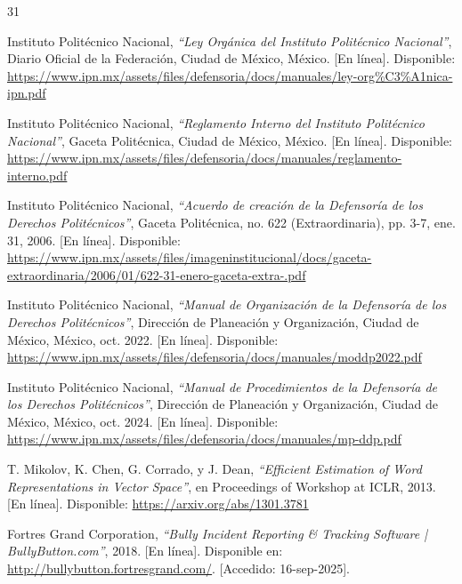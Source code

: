 
\begin{thebibliography}{31}
\sloppy

Instituto Politécnico Nacional, \textit{``Ley Orgánica del Instituto Politécnico Nacional''}, Diario Oficial de la Federación, Ciudad de México, México. [En línea]. Disponible: \url{https://www.ipn.mx/assets/files/defensoria/docs/manuales/ley-org%C3%A1nica-ipn.pdf}

Instituto Politécnico Nacional, \textit{``Reglamento Interno del Instituto Politécnico Nacional''}, Gaceta Politécnica, Ciudad de México, México. [En línea]. Disponible: \url{https://www.ipn.mx/assets/files/defensoria/docs/manuales/reglamento-interno.pdf}

Instituto Politécnico Nacional, \textit{``Acuerdo de creación de la Defensoría de los Derechos Politécnicos''}, Gaceta Politécnica, no. 622 (Extraordinaria), pp. 3-7, ene. 31, 2006. [En línea]. Disponible: \url{https://www.ipn.mx/assets/files/imageninstitucional/docs/gaceta-extraordinaria/2006/01/622-31-enero-gaceta-extra-.pdf}

Instituto Politécnico Nacional, \textit{``Manual de Organización de la Defensoría de los Derechos Politécnicos''}, Dirección de Planeación y Organización, Ciudad de México, México, oct. 2022. [En línea]. Disponible: \url{https://www.ipn.mx/assets/files/defensoria/docs/manuales/moddp2022.pdf}

Instituto Politécnico Nacional, \textit{``Manual de Procedimientos de la Defensoría de los Derechos Politécnicos''}, Dirección de Planeación y Organización, Ciudad de México, México, oct. 2024. [En línea]. Disponible: \url{https://www.ipn.mx/assets/files/defensoria/docs/manuales/mp-ddp.pdf}

T. Mikolov, K. Chen, G. Corrado, y J. Dean, \textit{``Efficient Estimation of Word Representations in Vector Space''}, en Proceedings of Workshop at ICLR, 2013. [En línea]. Disponible: \url{https://arxiv.org/abs/1301.3781}

Fortres Grand Corporation, \textit{``Bully Incident Reporting \& Tracking Software | BullyButton.com''}, 2018. [En línea]. Disponible en: \url{http://bullybutton.fortresgrand.com/}. [Accedido: 16-sep-2025].


\end{thebibliography}
